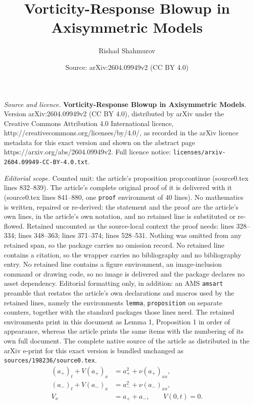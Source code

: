 \documentclass[10pt,a4paper]{amsart}
\title{\textbf{Vorticity-Response Blowup in Axisymmetric Models}}
\author{Rishad Shahmurov}
\date{Source: arXiv:2604.09949v2 (CC BY 4.0)}
\begin{document}
\maketitle

\noindent\emph{Source and licence.} \textbf{Vorticity-Response Blowup in Axisymmetric Models}. Version arXiv:2604.09949v2 (CC BY 4.0), distributed by arXiv under the Creative Commons Attribution 4.0 International licence, http://creativecommons.org/licenses/by/4.0/, as recorded in the arXiv licence metadata for this exact version and shown on the abstract page https://arxiv.org/abs/2604.09949v2. Full licence notice: \texttt{licenses/arxiv-2604.09949-CC-BY-4.0.txt}.\par\smallskip

\noindent\textit{Editorial scope.} Counted unit: the article's proposition prop:continue (source0.tex lines 832--839). The article's complete original proof of it is delivered with it (source0.tex lines 841--880, one \texttt{proof} environment of 40 lines). No mathematics is written, repaired or re-derived: the statement and the proof are the article's own lines, in the article's own notation, and no retained line is substituted or re-flowed.  Retained uncounted as the source-local context the proof needs: lines 328--334; lines 348--363; lines 371--374; lines 528--531.  Nothing was omitted from any retained span, so the package carries no omission record.  No retained line contains a citation, so the wrapper carries no bibliography and no bibliography entry.  No retained line contains a figure environment, an image-inclusion command or drawing code, so no image is delivered and the package declares no asset dependency.  Editorial formatting only, in addition: an AMS \texttt{amsart} preamble that restates the article's own declarations and macros used by the retained lines, namely the environments \texttt{lemma}, \texttt{proposition} on separate counters, together with the standard packages those lines need.  The retained environments print in this document as Lemma 1, Proposition 1 in order of appearance, whereas the article prints the same items with the numbering of its own full document.  The complete native source of the article as distributed in the arXiv e-print for this exact version is bundled unchanged as \texttt{sources/198236/source0.tex}.
\begin{equation}\label{eq:twochannel}
\begin{aligned}
 (a_+)_t+V(a_+)_x&=a_+^2+\nu(a_+)_{xx},\\
 (a_-)_t+V(a_-)_x&=a_-^2+\nu(a_-)_{xx},\\
 V_x&=a_++a_-,\qquad V(0,t)=0.
\end{aligned}
\end{equation}
\end{document}
